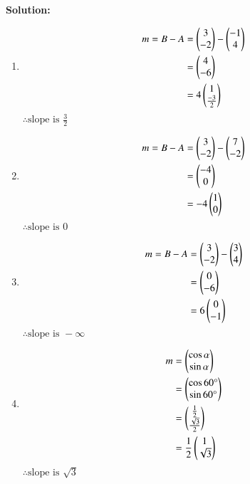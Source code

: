 \documentclass[journal]{IEEEtran}
\begin{document}
\textbf{Solution: }\\
\begin{enumerate}
	\item{
			\begin{align*} m = B-A &= \begin{pmatrix}3 \\ -2\end{pmatrix} - \begin{pmatrix}-1 \\ 4\end{pmatrix} \\
				&= \begin{pmatrix}4 \\ -6\end{pmatrix} \\
				&= 4\begin{pmatrix}1 \\ \frac{-3}{2}\end{pmatrix}
		\end{align*}
		$\therefore \text{slope is } \frac{3}{2}$
	}
	\item{
			\begin{align*} m = B-A &= \begin{pmatrix}3 \\ -2\end{pmatrix} - \begin{pmatrix}7 \\ -2\end{pmatrix} \\
				&= \begin{pmatrix}-4 \\ 0\end{pmatrix} \\
				&= -4\begin{pmatrix}1 \\ 0\end{pmatrix}
		\end{align*}
		$\therefore \text{slope is } 0$
	}
	\item{
			\begin{align*} m = B-A &= \begin{pmatrix}3 \\ -2\end{pmatrix} - \begin{pmatrix}3 \\ 4\end{pmatrix} \\
				&= \begin{pmatrix}0 \\ -6\end{pmatrix} \\
				&= 6\begin{pmatrix}0 \\ -1\end{pmatrix}
		\end{align*}
		$\therefore \text{slope is } -\infty$
	}
	\item{
			\begin{align*} m &= \begin{pmatrix}\cos \alpha \\ \sin \alpha\end{pmatrix} \\
				&= \begin{pmatrix}\cos 60\degree \\ \sin 60\degree\end{pmatrix} \\
				&= \begin{pmatrix}\frac{1}{2} \\ \frac{\sqrt{3}}{2}\end{pmatrix} \\
				&= \frac{1}{2} \begin{pmatrix}1 \\ \sqrt{3}\end{pmatrix} \\
		\end{align*}
		$\therefore \text{slope is } \sqrt{3}$
	}
\end{enumerate}


\renewcommand{\thefigure}{\theenumi}
\renewcommand{\thetable}{\theenumi}
\end{document}
